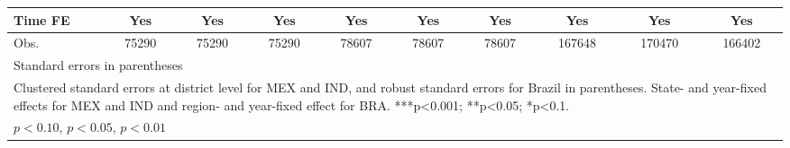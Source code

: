 \begin{table}[htbp]
\begin{tabular}{l*{9}{c}}
Time FE     &         Yes         &         Yes         &         Yes         &         Yes         &         Yes         &         Yes         &         Yes         &         Yes         &         Yes         \\
\hline
Obs.        &       75290         &       75290         &       75290         &       78607         &       78607         &       78607         &      167648         &      170470         &      166402         \\
\hline\hline
\multicolumn{10}{l}{\footnotesize Standard errors in parentheses}\\
\multicolumn{10}{l}{\footnotesize Clustered standard errors at district level for MEX and IND, and robust standard errors for Brazil in parentheses. State- and year-fixed effects for MEX and IND and region- and year-fixed effect for BRA. ***p<0.001; **p<0.05; *p<0.1.}\\
\multicolumn{10}{l}{\footnotesize \sym{*} \(p<0.10\), \sym{**} \(p<0.05\), \sym{***} \(p<0.01\)}\\
\end{tabular}
\end{table}
